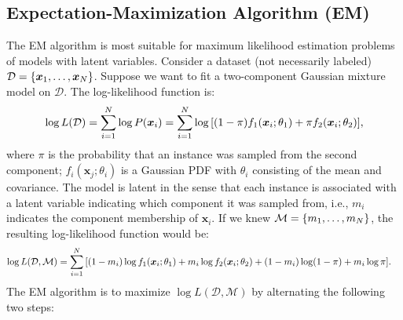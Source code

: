 \subsection{Expectation-Maximization Algorithm (EM)}
    The EM algorithm is most suitable for maximum likelihood estimation problems of models with latent variables.
    Consider a dataset (not necessarily labeled) $\mathcal{D} = \{ \bm{x}_1, \ldots, \bm{x}_N \}$.
    Suppose we want to fit a two-component Gaussian mixture model on $\mathcal{D}$.
    The log-likelihood function is:
        \begin{equation}
            \log L(\mathcal{D}) = \sum_{i=1}^{N}{\log P(\bm{x}_i)} = \sum_{i=1}^{N}{\log\left[ (1-\pi)f_1(\bm{x}_i; \theta_1) + \pi f_2(\bm{x}_i; \theta_2) \right]},
        \end{equation}
    where $\pi$ is the probability that an instance was sampled from the second component; $f_i(\bm{x}_j; \theta_i)$ is a Gaussian PDF with $\theta_i$ consisting of the mean and covariance.
    The model is latent in the sense that each instance is associated with a latent variable indicating which component it was sampled from, i.e., $m_i$ indicates the component membership of $\bm{x}_i$.
    If we knew $\mathcal{M} = \{ m_1, \ldots, m_N \}$, the resulting log-likelihood function would be:
        \begin{equation}
            \begin{aligned}
            \log L(\mathcal{D}, \mathcal{M}) & = \sum_{i=1}^{N}{
                \left[
                    (1 - m_i) \log f_1(\bm{x}_i; \theta_1) + m_i  \log f_2(\bm{x}_i; \theta_2) + 
                    (1 - m_i) \log(1 - \pi) + m_i \log\pi
                \right]
            }.
            \end{aligned}
        \end{equation}
    The EM algorithm is to maximize $\log L(\mathcal{D}, \mathcal{M})$ by alternating the following two steps:
